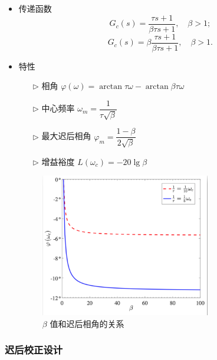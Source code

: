 \documentclass[14pt,a4paper]{article}
\theoremstyle{plain}
\theoremstyle{definition}
\theoremstyle{remark}
\theoremstyle{plain}
\theoremstyle{plain}
\theoremstyle{plain}
\theoremstyle{definition}
\theoremstyle{remark}
\numberwithin{equation}{section}
\begin{document}
			\begin{itemize}
				\item 传递函数 
					\[
						G_c(s) = \dfrac{\tau s+1}{\beta \tau s+1} , \quad \beta > 1
					;\]
					\[
						G_c(s) = \beta\dfrac{\tau s+1}{\beta \tau s+1} , \quad \beta > 1
					.\] 
				\item 特性 
					\begin{itemize}
						\item[$\triangleright$] 相角 $\varphi(\omega ) = \arctan \tau \omega - \arctan \beta\tau \omega $  
						\item[$\triangleright$] 中心频率 $\omega_{m} = \dfrac{1}{\tau \sqrt{\beta }}$ 
						\item[$\triangleright$] 最大迟后相角 $\varphi_{m} = \dfrac{1-\beta }{2\sqrt{\beta }}$ 
						\item[$\triangleright$] 增益裕度 $L(\omega_c ) = -20 \lg \beta $ 
					\end{itemize} 
					\begin{figure}[H]
						\centering
						\includegraphics[width=0.7\textwidth]{./figures/lagBeta.png} 
						\caption{$\beta $ 值和迟后相角的关系}
						\label{fig:lagBeta}
					\end{figure}
			\end{itemize}  

			\subsubsection{迟后校正设计}%
			\label{ssub:迟后校正设计}
			
\end{document}
